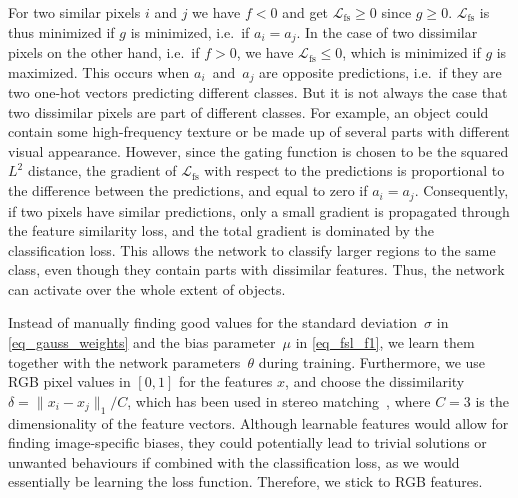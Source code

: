 \documentclass{article}
\begin{document}
For two similar pixels $i$ and $j$ we have $f < 0$ and get $\mathcal{L}_{\mathrm{fs}} \geq 0$ since $g \geq 0$. $\mathcal{L}_{\mathrm{fs}}$ is thus minimized if $g$ is minimized, i.e.~if $a_i = a_j$. In the case of two dissimilar pixels on the other hand, i.e.~if $f > 0$, we have $\mathcal{L}_{\mathrm{fs}} \leq 0$, which is minimized if $g$ is maximized. This occurs when $a_i$~and~$a_j$ are opposite predictions, i.e.~if they are two one-hot vectors predicting different classes. But it is not always the case that two dissimilar pixels are part of different classes. For example, an object could contain some high-frequency texture or be made up of several parts with different visual appearance. However, since the gating function is chosen to be the squared $L^2$ distance, the gradient of $\mathcal{L}_{\mathrm{fs}}$ with respect to the predictions is proportional to the difference between the predictions, and equal to zero if $a_i = a_j$. Consequently, if two pixels have similar predictions, only a small gradient is propagated through the feature similarity loss, and the total gradient is dominated by the classification loss. This allows the network to classify larger regions to the same class, even though they contain parts with dissimilar features. Thus, the network can activate over the whole extent of objects.

\iffalse
Consequently, if two pixels already have the same prediction, then no gradient is propagated through the feature similarity loss term, independent of the features. This allows the network to activate over the whole extent of objects, even though they contain parts with dissimilar features.

Consequently, if two pixels have similar predictions, only a small gradient is propagated through the feature similarity loss, and the total gradient is dominated by the classification loss. This allows the network to classify regions to the same class, even though they contain parts with dissimilar features. Thus it can activate over the whole extent of objects.
\fi

Instead of manually finding good values for the standard deviation~$\sigma$ in \eqref{eq_gauss_weights} and the bias parameter~$\mu$ in \eqref{eq_fsl_f1}, we learn them together with the network parameters~$\theta$ during training. Furthermore, we use RGB pixel values in $[0, 1]$ for the features $x$, and choose the dissimilarity $\delta = \lVert x_i - x_j \rVert_1 / C$, which has been used in stereo matching~\cite{galar2013oe}, where $C=3$ is the dimensionality of the feature vectors. Although learnable features would allow for finding image-specific biases, they could potentially lead to trivial solutions or unwanted behaviours if combined with the classification loss, as we would essentially be learning the loss function. Therefore, we stick to RGB features.
\end{document}
